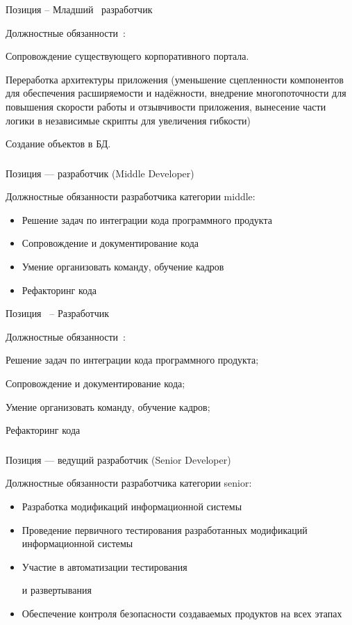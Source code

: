 \documentclass{../industrial-development}
\begin{document}
\lecturenotes

Позиция – Младший~\cite{itcf} разработчик~\cite{hh}

Должностные обязанности~\cite{rab}:

Сопровождение существующего корпоративного портала.

Переработка архитектуры приложения (уменьшение сцепленности компонентов для обеспечения расширяемости и надёжности, внедрение многопоточности для повышения скорости работы и отзывчивости приложения, вынесение части логики в независимые скрипты для увеличения гибкости)

 
Создание объектов в БД.


\begin{frame} \frametitle{}
 \begin{block}{}
  \alert{Позиция --- разработчик (Middle Developer)}

Должностные обязанности разработчика категории middle: 
  \end{block}
  \begin{itemize}
  \item Решение задач по интеграции кода программного продукта
  \item Сопровождение и документирование кода
  \item Умение организовать команду, обучение кадров
  \item Рефакторинг кода
  \end{itemize}
\end{frame}

\lecturenotes

Позиция~\cite{hh} – Разработчик ~\cite{itcf}

Должностные обязанности~\cite{rab}:

Решение задач по интеграции кода программного продукта;

Сопровождение и документирование кода;

Умение организовать  команду, обучение кадров;

 Рефакторинг кода


\begin{frame} \frametitle{}
 \begin{block}{}
  \alert{Позиция --- ведущий разработчик (Senior Developer)}

Должностные обязанности разработчика категории senior: 
  \end{block}
  \begin{itemize}
  \item Разработка модификаций информационной системы
  \item Проведение первичного тестирования разработанных модификаций информационной системы
 \item  Участие в автоматизации тестирования 

и развертывания
  \item Обеспечение контроля безопасности создаваемых продуктов на всех этапах
  \end{itemize}
\end{frame}
\end{document}
